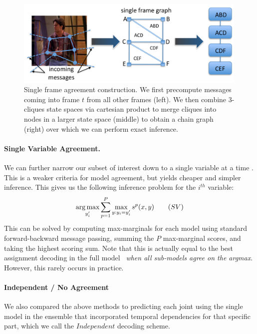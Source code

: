 \begin{figure}[tb]
\begin{center}
\includegraphics[width=0.99\textwidth]{figs/single-frame-agreement.pdf}
\caption[Single Frame Agreement construction]{Single frame agreement 
construction.  We first precompute messages coming into frame $t$ from all 
other frames (left).  We then combine 3-cliques state spaces via cartesian 
product to merge cliques into nodes in a larger state space (middle) to obtain 
a chain graph (right) over which we can perform exact inference.}
\label{fig:single-frame-agreement}
\end{center}
\end{figure}



\paragraph{Single Variable Agreement.} 

We can further narrow our subset of interest down to a single variable
at a time \citep{weisssapp10}.  This is a weaker criteria for model
agreement, but yields cheaper and simpler inference.  This gives us
the following inference problem for the $i^{th}$ variable:
\begin{equation}
\mathop{\arg\max}_{y_i'} \sum_{p=1}^P \max_{y: y_i=y_i'} s^p(x,y) \quad{}\quad{(SV)}
\end{equation}
This can be solved by computing max-marginals for each model using standard forward-backward message passing, summing the $P$ max-marginal scores, and taking the highest scoring sum.
Note that this is actually equal to the best assignment decoding in the full 
model~ {\em when all sub-models agree on the argmax}.  
However, this rarely occurs in practice.

\paragraph{Independent / No Agreement}
We also compared the above methods to predicting each joint using the single 
model in the ensemble that incorporated temporal dependencies for that
specific part, which we call the $Independent$ decoding scheme.


